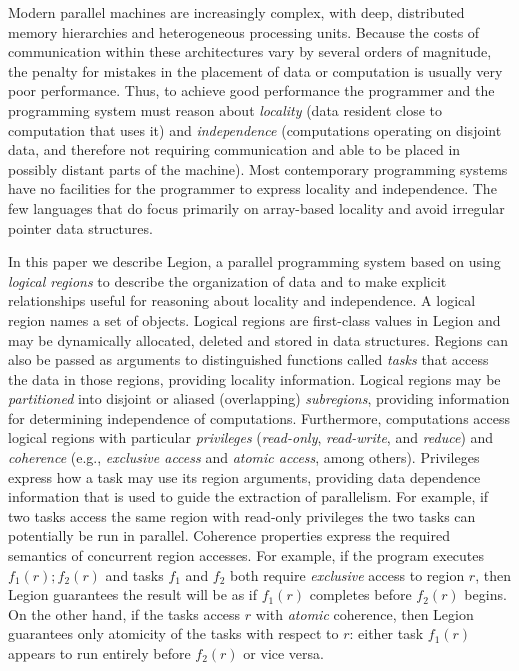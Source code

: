 \documentclass[conference]{IEEEtran}
\begin{document}
Modern parallel machines are increasingly complex, with deep,
distributed memory hierarchies and heterogeneous processing units.  Because the
costs of communication within these architectures vary by several orders of magnitude, 
the penalty for mistakes in the placement of data or computation is usually very poor performance.  Thus,
to achieve good performance the programmer
and the programming system must reason about {\em locality} (data resident
close to computation that uses it) and {\em independence} (computations
operating on disjoint data, and therefore not requiring communication and able to be placed in possibly distant parts of the machine).  
Most contemporary
programming systems have no facilities for the programmer to express locality
and independence.  The few languages that do focus primarily on
array-based locality \cite{Fatahalian06,CHAPEL04,UPC99} and 
avoid irregular pointer data structures.  
%
%

In this paper we describe Legion, a parallel programming system based
on using {\em logical regions} to describe the organization of data
and to make explicit relationships useful for reasoning about locality
and independence.
A logical region names a set of objects.  Logical regions are first-class 
values in Legion and may be dynamically allocated, deleted and stored
in data structures. Regions can also be passed as arguments
to distinguished functions called {\em tasks} that access the data in
those regions, providing locality information.  Logical regions may be
{\em partitioned} into disjoint or aliased (overlapping) {\em subregions}, providing
information for determining independence of computations.
Furthermore, computations access logical regions with particular {\em
  privileges} ({\em read-only}, {\em read-write}, and {\em reduce}) and {\em coherence} (e.g., {\em exclusive access} and {\em
  atomic access}, among others).  Privileges express how a task may use
its region arguments, providing data dependence information that
is used to guide the extraction of parallelism.  For example, if two tasks
access the same region with read-only privileges the two tasks
can potentially be run in parallel.
Coherence properties express the required semantics of concurrent region accesses.
For example, if the program executes $f_1(r); f_2(r)$ and tasks $f_1$
and $f_2$ both require {\em exclusive} access to region $r$, then Legion guarantees the result will
be as if $f_1(r)$ completes before $f_2(r)$ begins.   On the other hand, if
the tasks access $r$ with {\em atomic} coherence, then Legion
guarantees only atomicity of the tasks with respect to $r$: either task $f_1(r)$
appears to run entirely before $f_2(r)$ or vice versa.
\end{document}
